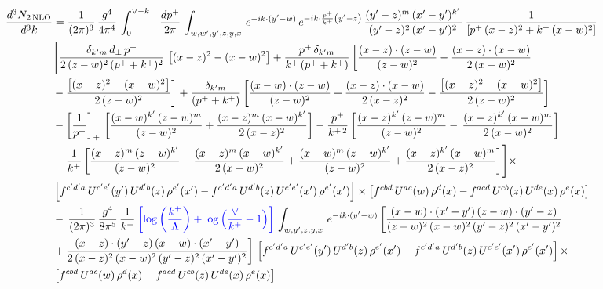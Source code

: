 \documentclass[9pt]{article}
\numberwithin{equation}{section}
\begin{document}
\begin{align}
 \frac{d^{3}N_{2\,\rm NLO}}{d^{3}k} & = \frac{1}{(2\pi)^{3}}\,\frac{g^{4}}{4\pi^{4}}\,\int_{0}^{\vee-k^{+}}\, \frac{dp^{+}}{2\pi}\,\int_{w,w',y',z,y,x}\, e^{-ik\cdot (y'-w)}\,e^{-ik\cdot \frac{p^{+}}{k^{+}}\left(y'-z\right)}\, \frac{(y'-z)^{m}\,(x'-y')^{k'}\,}{(y'-z)^{2}\,(x'-y')^{2}\,}\, \frac{1}{\left[p^{+}\,(x-z)^{2}+k^{+}\,(x-w)^{2}\right]}\notag \\ & \Bigg[\frac{\delta_{k'm}\,d_{\perp}\,p^{+}}{2\,(z-w)^{2}\,(p^{+}+k^{+})^{2}}\, \left[(x-z)^{2}-(x-w)^{2}\right]+\frac{p^{+}\,\delta_{k'm}}{k^{+}\,(p^{+}+k^{+})}\,\bigg[\frac{(x-z)\cdot (z-w)}{(z-w)^{2}} -\frac{(x-z)\cdot (x-w)}{2\,(x-w)^{2}}\notag \\ & -\frac{\left[(x-z)^{2}-(x-w)^{2}\right]}{2\,(z-w)^{2}}\bigg] +\frac{\delta_{k'm}}{(p^{+}+k^{+})}\,\bigg[\frac{(x-w)\cdot (z-w)}{(z-w)^{2}}+\frac{(x-z)\cdot (x-w)}{2\,(x-z)^{2}} -\frac{\left[(x-z)^{2}-(x-w)^{2}\right]}{2\,(z-w)^{2}}\bigg]\notag \\ & -\left[\frac{1}{p^{+}}\right]_{+}\,\bigg[\frac{(x-w)^{k'}\,(z-w)^{m}}{(z-w)^{2}}+\frac{(x-z)^{m}\,(x-w)^{k'}}{2\,(x-z)^{2}}\bigg]-\frac{p^{+}}{k^{+\,2}}\,\bigg[\frac{(x-z)^{k'}\,(z-w)^{m}}{(z-w)^{2}} -\,\frac{(x-z)^{k'}\,(x-w)^{m}}{2\,(x-w)^{2}}\bigg]\notag \\ & -\frac{1}{k^{+}}\,\bigg[\frac{(x-z)^{m}\,(z-w)^{k'}}{(z-w)^{2}}-\frac{(x-z)^{m}\,(x-w)^{k'}}{2\,(x-w)^{2}}+\frac{(x-w)^{m}\,(z-w)^{k'}}{(z-w)^{2}} +\frac{(x-z)^{k'}\,(x-w)^{m}}{2\,(x-z)^{2}}\bigg]\Bigg]\times\,\notag \\ & \left[f^{c'd'a}\,U^{c'e'}(y')\,U^{d'b}(z)\,\rho^{e'}(x')-f^{c'd'a}\, 
    U^{d'b}(z)\,U^{c'e'}(x')\,\rho^{e'}(x')\right]\times \left[f^{cbd}\,U^{ac}(w)\,\rho^{d}(x) -f^{acd}\,U^{cb}(z)\,U^{de}(x)\,\rho^{e}(x)\right]\notag \\ &  -\, \frac{1}{(2\pi)^{3}}\,\frac{g^{4}}{8\pi^{5}}\,\frac{1}{k^{+}}\,{\color{blue}\left[\log{\left(\frac{k^{+}}{\Lambda}\right)}+\log{\left(\frac{\vee}{k^{+}}-1\right)}\right]}\,\int_{w,y',z,y,x}\, e^{-ik\cdot (y'-w)}\,\bigg[\frac{(x-w)\cdot (x'-y')\,(z-w)\cdot (y'-z)}{(z-w)^{2}\,(x-w)^{2}\,(y'-z)^{2}\,(x'-y')^{2}}\notag \\ & +\frac{(x-z)\cdot (y'-z)\,(x-w)\cdot (x'-y')}{2\,(x-z)^{2}\,(x-w)^{2}\,(y'-z)^{2}\,(x'-y')^{2}}\bigg]\, \left[f^{c'd'a}\,U^{c'e'}(y')\,U^{d'b}(z)\,\rho^{e'}(x')-f^{c'd'a}\, 
    U^{d'b}(z)\,U^{c'e'}(x')\,\rho^{e'}(x')\right]\times\notag \\ &  \left[f^{cbd}\,U^{ac}(w)\,\rho^{d}(x) -f^{acd}\,U^{cb}(z)\,U^{de}(x)\,\rho^{e}(x)\right] 
\end{align}
\end{document}
